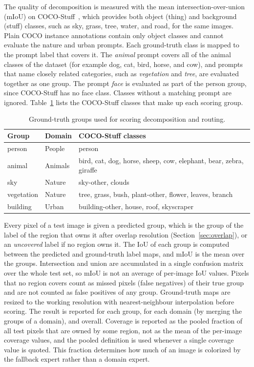 \documentclass{FastFyp}
\begin{document}
The quality of decomposition is measured with the mean intersection-over-union (mIoU) on COCO-Stuff~\cite{caesar2018cocostuff}, which provides both object (thing) and background (stuff) classes, such as sky, grass, tree, water, and road, for the same images. Plain COCO instance annotations contain only object classes and cannot evaluate the nature and urban prompts. Each ground-truth class is mapped to the prompt label that covers it. The \textit{animal} prompt covers all of the animal classes of the dataset (for example dog, cat, bird, horse, and cow), and prompts that name closely related categories, such as \textit{vegetation} and \textit{tree}, are evaluated together as one group. The prompt \textit{face} is evaluated as part of the person group, since COCO-Stuff has no face class. Classes without a matching prompt are ignored. Table~\ref{tab:a_groups} lists the COCO-Stuff classes that make up each scoring group.

\begin{table}[htbp]
\centering
\caption{Ground-truth groups used for scoring decomposition and routing.}
\label{tab:a_groups}
\begin{tabular}{|l|l|p{7.5cm}|}
\hline
\textbf{Group} & \textbf{Domain} & \textbf{COCO-Stuff classes} \\ \hline
person & People & person \\ \hline
animal & Animals & bird, cat, dog, horse, sheep, cow, elephant, bear, zebra, giraffe \\ \hline
sky & Nature & sky-other, clouds \\ \hline
vegetation & Nature & tree, grass, bush, plant-other, flower, leaves, branch \\ \hline
building & Urban & building-other, house, roof, skyscraper \\ \hline
\end{tabular}
\end{table}

Every pixel of a test image is given a predicted group, which is the group of the label of the region that owns it after overlap resolution (Section~\ref{sec:overlap}), or an \textit{uncovered} label if no region owns it. The IoU of each group is computed between the predicted and ground-truth label maps, and mIoU is the mean over the groups. Intersection and union are accumulated in a single confusion matrix over the whole test set, so mIoU is not an average of per-image IoU values. Pixels that no region covers count as missed pixels (false negatives) of their true group and are not counted as false positives of any group. Ground-truth maps are resized to the working resolution with nearest-neighbour interpolation before scoring. The result is reported for each group, for each domain (by merging the groups of a domain), and overall. Coverage is reported as the pooled fraction of all test pixels that are owned by some region, not as the mean of the per-image coverage values, and the pooled definition is used whenever a single coverage value is quoted. This fraction determines how much of an image is colorized by the fallback expert rather than a domain expert.
\end{document}

